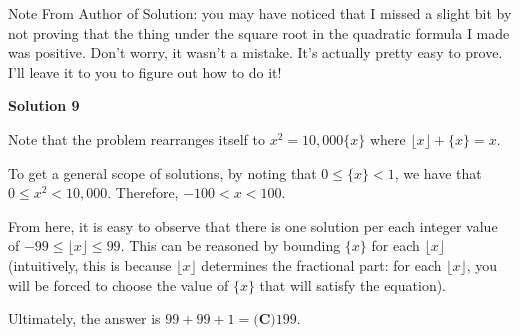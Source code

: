 \begin{enumerate}
 
Note From Author of Solution: you may have noticed that I missed a slight bit by not proving that the thing under the square root in the quadratic formula I made was positive. Don't worry, it wasn't a mistake. It's actually pretty easy to prove. I'll leave it to you to figure out how to do it!

 



\textbf{Solution 9}

Note that the problem rearranges itself to $x^2=10,000\{x\}$ where $\lfloor x \rfloor + \{x\} = x$.

 
To get a general scope of solutions, by noting that $0 \leq \{x\} < 1$, we have that $0 \leq x^2 < 10,000$. Therefore, $-100 < x < 100$.

 
From here, it is easy to observe that there is one solution per each integer value of $-99 \leq \lfloor x \rfloor \leq 99$. This can be reasoned by bounding $\{x\}$ for each $\lfloor x \rfloor$ (intuitively, this is because $\lfloor x \rfloor$ determines the fractional part: for each $\lfloor x \rfloor$, you will be forced to choose the value of $\{x\}$ that will satisfy the equation).

 
Ultimately, the answer is $99+99+1 = \boxed{\textbf{(C)} 199}$.

 


 


\end{enumerate}